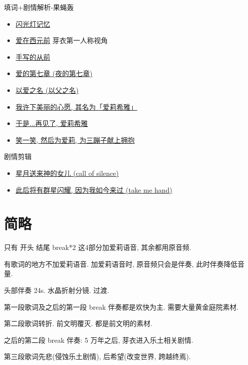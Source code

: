 \documentclass[a4paper]{article}
\begin{document}
填词+剧情解析-果蝇轰

\begin{itemize}
    \item \href{https://www.bilibili.com/video/BV1HppJeuEis/}{闪光灯记忆}
    \item \href{https://www.bilibili.com/video/BV1qN411g71m/}{爱在西元前} 芽衣第一人称视角
    \item \href{https://www.bilibili.com/video/BV1PV4y1x7CD/}{手写的从前}
    \item \href{https://www.bilibili.com/video/BV1dr4y177gy/}{爱的第七章 (夜的第七章)}
    \item \href{https://www.bilibili.com/video/BV1Yr4y1q7Pt/}{以爱之名 (以父之名)}
    \item \href{https://www.bilibili.com/video/BV1BF411w7fD/}{我许下美丽的心愿, 其名为「爱莉希雅」}
    \item \href{https://www.bilibili.com/video/BV1Cr4y1573W/}{于是...再见了, 爱莉希雅}
    \item \href{https://www.bilibili.com/video/BV1WN4y1L745/}{笑一笑, 然后为爱莉, 为三蹦子献上拥抱}
\end{itemize}

剧情剪辑

\begin{itemize}
    \item \href{https://www.bilibili.com/video/BV1ZT4y1s7Zd/}{星月送来神的女儿 (call of silence)}
    \item \href{https://www.bilibili.com/video/BV1Sm41167aK/}{此后将有群星闪耀, 因为我如今来过 (take me hand)}
\end{itemize}

\section{简略}

只有 开头 结尾 break*2 这4部分加爱莉语音, 其余都用原音频.

有歌词的地方不加爱莉语音. 加爱莉语音时, 原音频只会是伴奏, 此时伴奏降低音量.

头部伴奏 24s. 水晶折射分镜. 过渡.

第一段歌词及之后的第一段 break 伴奏都是欢快为主. 需要大量黄金庭院素材.

第二段歌词转折. 前文明覆灭. 都是前文明的素材.

之后的第二段 break 伴奏: 5 万年之后, 芽衣进入乐土相关剧情.

第三段歌词先悲(侵蚀乐土剧情), 后希望(改变世界, 跨越终焉).
\end{document}
